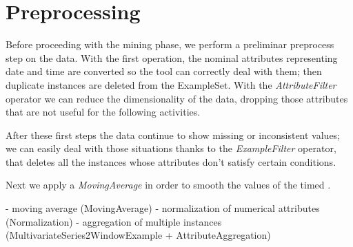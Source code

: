 \section{Preprocessing}

Before proceeding with the mining phase, we perform a preliminar preprocess step on the data. 
With the first operation, the nominal attributes representing date and time are converted so the tool can correctly deal with them; then duplicate instances are deleted from the ExampleSet. With the \textit{AttributeFilter} operator we can reduce the dimensionality of the data, dropping those attributes that are not useful for the following activities.

After these first steps the data continue to show missing or inconsistent values; we can easily deal with those situations thanks to the \textit{ExampleFilter} operator, that deletes all the instances whose attributes don't satisfy certain conditions.     

Next we apply a \textit{MovingAverage} in order to smooth the values of the timed .

- moving average (MovingAverage)
- normalization of numerical attributes (Normalization)
- aggregation of multiple instances  (MultivariateSeries2WindowExample + AttributeAggregation)